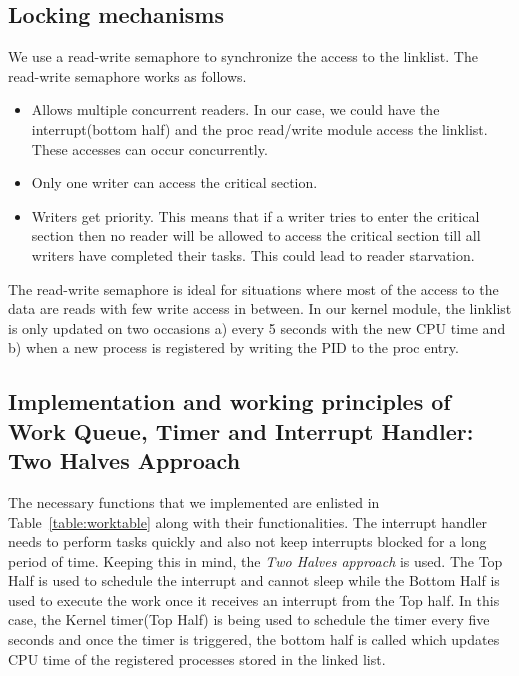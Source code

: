 \documentclass[11pt]{article}
\begin{document}
\subsection{Locking mechanisms}\label{subsec:Lock}
We use a read-write semaphore to synchronize the access to the linklist. The read-write semaphore works as follows.
\begin{itemize}
  \item Allows multiple concurrent readers. In our case, we could have the interrupt(bottom half) and the proc read/write module access the linklist. These accesses can occur concurrently. 
  \item Only one writer can access the critical section.  
  \item Writers get priority. This means that if a writer tries to enter the critical section then no reader will be allowed to access the critical section till all writers have completed their tasks. This could lead to reader starvation. 
\end{itemize}

The read-write semaphore is ideal for situations where most of the access to the data are reads with few write access in between. In our kernel module, the linklist is only updated on two occasions a) every 5 seconds with the new CPU time and b) when a new process is registered by writing the PID to the proc entry.


\subsection{Implementation and working principles of Work Queue, Timer and Interrupt Handler: Two Halves Approach}\label{subsec:WQ}

The necessary functions that we implemented are enlisted in Table~\ref{table:worktable} along with their functionalities. The interrupt handler needs to perform tasks quickly and also not keep interrupts blocked for a long period of time. Keeping this in mind, the {\em Two Halves approach} is used. The Top Half is used to schedule the interrupt and cannot sleep while the Bottom Half is used to execute the work once it receives an interrupt from the Top half. In this case, the Kernel timer(Top Half) is being used to schedule the timer every five seconds and once the timer is triggered, the bottom half is called which updates CPU time of the registered processes stored in the linked list.
\end{document}
